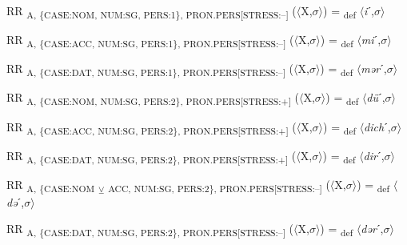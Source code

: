 {\begin{exe}
 RR \textsubscript{A, \{CASE:NOM, NUM:SG, PERS:1\}, PRON.PERS[STRESS:–]} ($\langle$X,$\sigma $$\rangle$) = \textsubscript{def} $\langle$\textit{i}ˊ,$\sigma $$\rangle$
\end{exe}

\begin{exe}
 RR \textsubscript{A, \{CASE:ACC, NUM:SG, PERS:1\}, PRON.PERS[STRESS:–]} ($\langle$X,$\sigma $$\rangle$) = \textsubscript{def} $\langle$\textit{mi}ˊ,$\sigma $$\rangle$
\end{exe}

\begin{exe}
 RR \textsubscript{A, \{CASE:DAT, NUM:SG, PERS:1\}, PRON.PERS[STRESS:–]} ($\langle$X,$\sigma $$\rangle$) = \textsubscript{def} $\langle$\textit{mər}ˊ,$\sigma $$\rangle$
\end{exe}

\begin{exe}
 RR \textsubscript{A, \{CASE:NOM, NUM:SG, PERS:2\}, PRON.PERS[STRESS:+]} ($\langle$X,$\sigma $$\rangle$) = \textsubscript{def} $\langle$\textit{dü}ˊ,$\sigma $$\rangle$
\end{exe}

\begin{exe}
 RR \textsubscript{A, \{CASE:ACC, NUM:SG, PERS:2\}, PRON.PERS[STRESS:+]} ($\langle$X,$\sigma $$\rangle$) = \textsubscript{def} $\langle$\textit{dich}ˊ,$\sigma $$\rangle$
\end{exe}

\begin{exe}
 RR \textsubscript{A, \{CASE:DAT, NUM:SG, PERS:2\}, PRON.PERS[STRESS:+]} ($\langle$X,$\sigma $$\rangle$) = \textsubscript{def} $\langle$\textit{dir}ˊ,$\sigma $$\rangle$
\end{exe}

\begin{exe}
 RR \textsubscript{A, \{CASE:NOM} \textsubscript{${\veebar}$}\textsubscript{ ACC, NUM:SG, PERS:2\}, PRON.PERS[STRESS:–]} ($\langle$X,$\sigma $$\rangle$) = \textsubscript{def} $\langle$\textit{də}ˊ,$\sigma $$\rangle$
\end{exe}

\begin{exe}
 RR \textsubscript{A, \{CASE:DAT, NUM:SG, PERS:2\}, PRON.PERS[STRESS:–]} ($\langle$X,$\sigma $$\rangle$) = \textsubscript{def} $\langle$\textit{dər}ˊ,$\sigma $$\rangle$
\end{exe}

}
